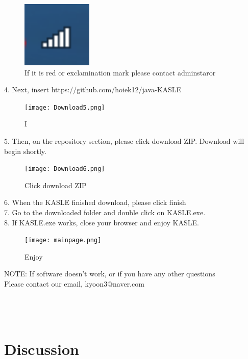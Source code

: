\documentclass[10pt,journal,compsoc]{IEEEtran}
\begin{document}
\begin{figure}[H]
\centering
\includegraphics[width=0.3\textwidth]{Connection.png}
{\caption*{If it is red or exclamination mark
		  please contact adminstaror }}
\end{figure}

4. Next, insert https://github.com/hoiek12/java-KASLE\\

\begin{figure}[H]
\centering
\texttt{[image: Download5.png]}
{\caption*{I }}
\end{figure}
5. Then, on the repository section, please click download ZIP. Download will begin shortly.\\

\begin{figure}[H]
\centering
\texttt{[image: Download6.png]}
{\caption*{Click download ZIP }}
\end{figure}
6. When the KASLE finished download, please click finish\\
7. Go to the downloaded folder and double click on KASLE.exe. \\
8. If KASLE.exe works, close your browser and enjoy KASLE.\\
\begin{figure}[H]
\centering
\texttt{[image: mainpage.png]}
{\caption*{Enjoy }}
\end{figure}
NOTE: If software doesn't work, or if you have any other questions \\
Please contact our email, kyoon3@naver.com\\
\\\\\\
\ifCLASSOPTIONcompsoc
{}
\else
\section{Discussion}
\label{sec:Discussion}
\fi
\end{document}
